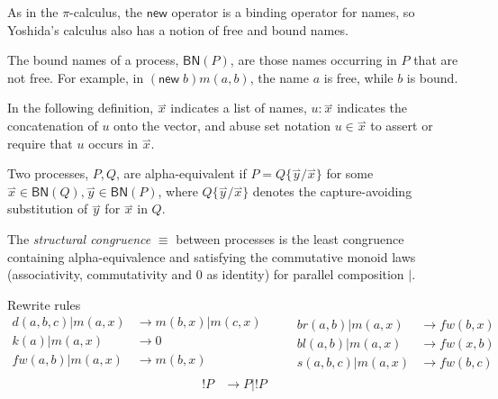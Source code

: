 \documentclass{llncs}
\newcommand{\new}{\mathsf{new}}
\newcommand{\pic}{$\pi$-calculus}
\newcommand{\pzero}{\mathbin{0}}
\newcommand{\scong}{\mathbin{\equiv}}
\newcommand{\freenames}[1]{\mathbin{\mathsf{FN}(#1)}}
\newcommand{\boundnames}[1]{\mathbin{\mathsf{BN}(#1)}}
\newcommand{\red}{\rightarrow}
\newcommand{\vect}[1]{\stackrel{\rightharpoonup}{#1}}
\begin{document}
As in the {\pic}, the $\new$ operator is a binding operator
for names, so Yoshida's calculus also has a notion of free and bound names.


The bound names of a process, $\boundnames{P}$, are those names occurring in $P$
that are not free. For example, in $(\new\; b)m(a,b)$, the name $a$ is free, while $b$ is bound.

In the following definition, $\vect{x}$ indicates a list of names,
$u:\vect{x}$ indicates the concatenation of $u$ onto the vector, and
abuse set notation $u \in \vect{x}$ to assert or require that $u$
occurs in $\vect{x}$.

\begin{definition}
Two processes, $P,Q$, are alpha-equivalent if $P = Q\{\vect{y}/\vect{x}\}$ for
some $\vect{x} \in \boundnames{Q},\vect{y} \in \boundnames{P}$, where $Q\{\vect{y}/\vect{x}\}$
denotes the capture-avoiding substitution of $\vect{y}$ for $\vect{x}$ in $Q$.
\end{definition}

\begin{definition}
  The {\em structural congruence} $\equiv$
  between processes \cite{SangiorgiWalker} is the least congruence containing
  alpha-equivalence and satisfying the commutative monoid laws
  (associativity, commutativity and $\pzero$ as identity) for parallel
  composition $|$.
\end{definition}

Rewrite rules
\[\begin{array}{rl}
  d(a,b,c) | m(a,x) & \red m(b,x) | m(c,x) \\
  k(a) | m(a,x) & \red 0 \\
  fw(a,b) | m(a,x) & \red m(b,x) \\
\end{array} \quad \quad
\begin{array}{rl}
  br(a,b) | m(a,x) & \red fw(b,x) \\
  bl(a,b) | m(a,x) & \red fw(x,b) \\
  s(a,b,c) | m(a,x) & \red fw(b,c)
\end{array}\]
\[\begin{array}{rl}
  !P & \red P|!P \\
\end{array}\]
\end{document}
